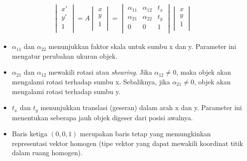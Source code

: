    

        \begin{equation}
         \begin{aligned}
            \begin{vmatrix}
                x' \\
                y' \\
                1 \\
            \end{vmatrix} = A \begin{vmatrix}
                x \\
                y \\
                1 \\
            \end{vmatrix} = \begin{vmatrix}
                \alpha_{11} & \alpha_{12} & t_x \\
                \alpha_{21} & \alpha_{22} & t_y \\
                0 & 0 & 1 \\
            \end{vmatrix} \begin{vmatrix}
                x \\
                y \\
                1 \\
            \end{vmatrix}
            \end{aligned} \label{Affine Transformation}
        \end{equation}


        \begin{itemize}
            \item $\alpha_{11}$ dan $\alpha_{22}$ menunjukkan faktor skala untuk sumbu x dan y. Parameter ini mengatur perubahan ukuran objek.

            \item  $\alpha_{21}$ dan $\alpha_{12}$ mewakili rotasi atau \textit{shearing}. Jika  $\alpha_{12} \neq 0$, maka objek akan mengalami rotasi terhadap sumbu x. Sebaliknya, jika $\alpha_{21} \neq 0$, objek akan mengalami rotasi terhadap sumbu y.

            \item $t_x$ dan $t_y$ menunjukkan translasi (geseran) dalam arah x dan y. Parameter ini menentukan seberapa jauh objek digeser dari posisi awalnya.

            \item Baris ketiga $(0,0,1)$ merupakan baris tetap yang memungkinkan representasi vektor homogen (tipe vektor yang dapat mewakili koordinat titik dalam ruang homogen).

            
        \end{itemize}

